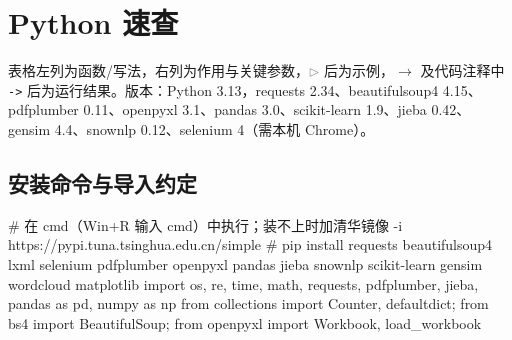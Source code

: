 \chapter{Python 速查}
\newcommand{\PYQbs}{\textbackslash}
\newcommand{\PYQe}{\enspace{\color{gray}$\triangleright$}\ }
\makeatletter
\newcommand{\PYQnobreak}{\def\LT@start{\let\LT@start\endgraf\endgraf\penalty\@M\vskip\LTpre\endgraf
  \ifdim\pagetotal<\pagegoal\else\dimen@=\pageshrink\advance\dimen@ 1sp \kern\dimen@\penalty 9999\endgraf\kern-\dimen@\fi
  \output{\LT@output}}}
\makeatother
\newenvironment{PYQtab}[1]{\par\footnotesize\linespread{1.0}\selectfont\xeCJKsetup{CJKecglue=\hskip 0pt}%
  \setlength{\LTpre}{2pt}\setlength{\LTpost}{3pt}%
  \setlength{\tabcolsep}{3pt}\renewcommand{\arraystretch}{1.0}\rowcolors{1}{}{gray!7}%
  \PYQnobreak
  \begin{longtable}{@{}>{\leavevmode\ttfamily\raggedright\arraybackslash}p{#1}>{\leavevmode\raggedright\arraybackslash}p{\dimexpr\textwidth-#1-6pt\relax}@{}}\noalign{\hrule height\heavyrulewidth\kern2pt}}%
  {\noalign{\kern2pt\hrule height\heavyrulewidth}\end{longtable}\par}

\noindent{}\quad 表格左列为函数/写法，右列为作用与关键参数，\textcolor{gray}{$\triangleright$} 后为示例，$\to$ 及代码注释中 \texttt{->} 后为运行结果。版本：Python 3.13，requests 2.34、beautifulsoup4 4.15、pdfplumber 0.11、openpyxl 3.1、pandas 3.0、scikit-learn 1.9、jieba 0.42、gensim 4.4、snownlp 0.12、selenium 4（需本机 Chrome）。

\section{安装命令与导入约定}
\begin{PYQcode}
# 在 cmd（Win+R 输入 cmd）中执行；装不上时加清华镜像 -i https://pypi.tuna.tsinghua.edu.cn/simple
# pip install requests beautifulsoup4 lxml selenium pdfplumber openpyxl pandas jieba snownlp scikit-learn gensim wordcloud matplotlib
import os, re, time, math, requests, pdfplumber, jieba, pandas as pd, numpy as np
from collections import Counter, defaultdict; from bs4 import BeautifulSoup; from openpyxl import Workbook, load_workbook
\end{PYQcode}

